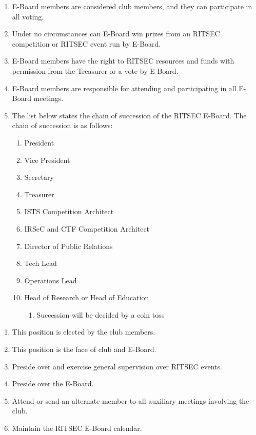 


\begin{enumerate}
  \item E-Board members are considered club members, and they can participate in all
    voting.
  \item Under no circumstances can E-Board win prizes from an RITSEC
    competition or RITSEC event run by E-Board.
  \item E-Board members have the right to RITSEC resources and funds with
    permission from the Treasurer or a vote by E-Board.
  \item E-Board members are responsible for attending and participating in all
    E-Board meetings.
  \item The list below states the chain of succession of the RITSEC E-Board.
    The chain of succession is as follows:
  \begin{enumerate}
    \item President
    \item Vice President
    \item Secretary
    \item Treasurer
    \item ISTS Competition Architect 
    \item IRSeC and CTF Competition Architect
    \item Director of Public Relations
    \item Tech Lead
    \item Operations Lead
    \item Head of Research or Head of Education 
    \begin{enumerate}
      \item Succession will be decided by a coin toss
    \end{enumerate}
  \end{enumerate}
\end{enumerate}


\begin{enumerate}
  \item This position is elected by the club members.
  \item This position is the face of club and E-Board.
  \item Preside over and exercise general supervision over RITSEC events. 
  \item Preside over the E-Board.
  \item Attend or send an alternate member to all auxiliary meetings involving the club.
  \item Maintain the RITSEC E-Board calendar.
\end{enumerate}

